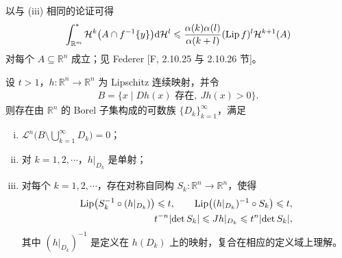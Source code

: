 \documentclass[../../main.tex]{subfiles}%
\begin{document}
\begin{remark}\label{remark:ch03-lem-3-5-推广}
以与 (iii) 相同的论证可得
\begin{align*}
\int^{*}_{\mathbb{R}^m}\mathcal{H}^k\bigl(A\cap f^{-1}\{y\}\bigr)\mathrm{d}\mathcal{H}^l\leqslant\frac{\alpha(k)\alpha(l)}{\alpha(k+l)}(\operatorname{Lip} f)^l\mathcal{H}^{k+1}(A)
\end{align*}
对每个 $A\subseteq\mathbb{R}^n$ 成立；见 Federer [F, 2.10.25 与 2.10.26 节]。
\end{remark}

\begin{lemma}\label{lemma:ch03-3-6}
设 $t>1$，$h:\mathbb{R}^n\to\mathbb{R}^n$ 为 Lipschitz 连续映射，并令
\begin{align*}
B=\{x\mid Dh(x)\text{ 存在},\ Jh(x)>0\}.
\end{align*}
则存在由 $\mathbb{R}^n$ 的 Borel 子集构成的可数族 $\{D_k\}_{k=1}^{\infty}$，满足
\begin{enumerate}[(i)]
\item $\mathcal{L}^n\bigl(B\setminus\bigcup_{k=1}^{\infty}D_k\bigr)=0$；
\item 对 $k=1,2,\cdots$，$h|_{D_k}$ 是单射；
\item 对每个 $k=1,2,\cdots$，存在对称自同构 $S_k:\mathbb{R}^n\to\mathbb{R}^n$，使得
\begin{align*}
\operatorname{Lip}\bigl(S_k^{-1}\circ(h|_{D_k})\bigr)\leqslant t,\qquad\operatorname{Lip}\bigl((h|_{D_k})^{-1}\circ S_k\bigr)\leqslant t,\\
t^{-n}\lvert\det S_k\rvert\leqslant Jh|_{D_k}\leqslant t^n\lvert\det S_k\rvert,
\end{align*}
其中 $(h|_{D_k})^{-1}$ 是定义在 $h(D_k)$ 上的映射，复合在相应的定义域上理解。
\end{enumerate}
\end{lemma}
\end{document}
